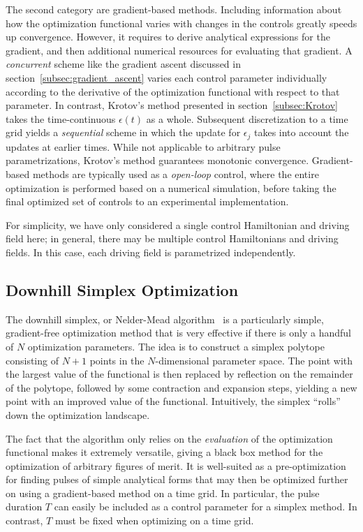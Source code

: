 The second category are gradient-based methods.
%
Including information about how the optimization functional varies with changes
in the controls greatly speeds up convergence. However, it requires to derive
analytical expressions for the gradient, and then additional numerical resources
for evaluating that gradient. A \emph{concurrent} scheme like the gradient
ascent discussed in section~\ref{subsec:gradient_ascent} varies each control
parameter individually according to the derivative of the optimization
functional with respect to that parameter. In contrast, Krotov's method
presented in section~\ref{subsec:Krotov} takes the time-continuous $\epsilon(t)$
as a whole. Subsequent discretization to a time grid yields a \emph{sequential}
scheme in which the update for $\epsilon_j$ takes into account the updates at
earlier times. While not applicable to arbitrary pulse
parametrizations, Krotov's method guarantees monotonic convergence.
Gradient-based methods are typically used as a \emph{open-loop} control, where
%
the entire optimization is performed based on a numerical simulation, before
taking the final optimized set of controls to an experimental implementation.

For simplicity, we have only considered a single control Hamiltonian and driving
field here; in general, there may be multiple control Hamiltonians and driving
fields.  In this case, each driving field is parametrized independently.

\subsection{Downhill Simplex Optimization}
\label{subsec:simplex}

The downhill simplex, or Nelder-Mead algorithm~\cite{NelderCJ1965} is a
%
particularly simple, gradient-free optimization method that is very effective
if there is only a handful of $N$ optimization parameters. The idea is to
construct a simplex polytope consisting of $N+1$ points in the $N$-dimensional
parameter space. The point with the largest value of the functional is then
replaced by reflection on the remainder of the polytope, followed by some
contraction and expansion steps, yielding a new point with an improved value of
the functional. Intuitively, the simplex ``rolls'' down the optimization
landscape.

The fact that the algorithm only relies on the \emph{evaluation} of the
optimization functional makes it extremely versatile, giving a black box method
for the optimization of arbitrary figures of merit. It is well-suited as
a pre-optimization for finding pulses of simple analytical forms that may then
be optimized further on using a gradient-based method on a time grid. In
particular, the pulse duration $T$ can easily be included as a control parameter
for a simplex method. In contrast, $T$ must be fixed when optimizing on a time
grid.

